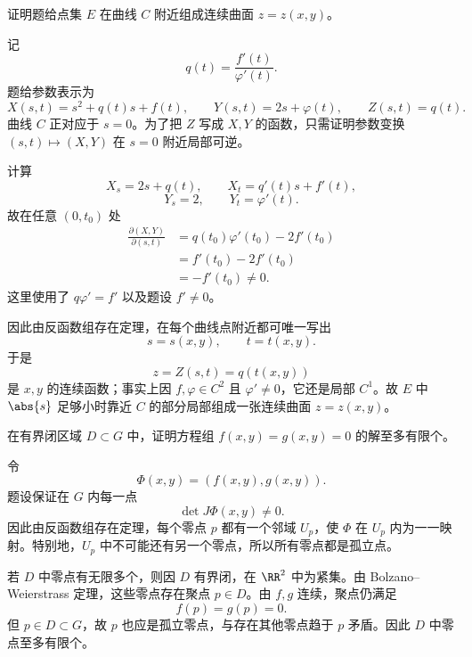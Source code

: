 \begin{xreferenceproblem}[20.5.2 第一组参考题 7]
证明题给点集 $E$ 在曲线 $C$ 附近组成连续曲面 $z=z(x,y)$。
\end{xreferenceproblem}
\begin{xsolution}
记
\[
  q(t)=\frac{f'(t)}{\varphi'(t)}.
\]
题给参数表示为
\[
  X(s,t)=s^2+q(t)s+f(t),
  \qquad
  Y(s,t)=2s+\varphi(t),
  \qquad
  Z(s,t)=q(t).
\]
曲线 $C$ 正对应于 $s=0$。为了把 $Z$ 写成 $X,Y$ 的函数，只需证明参数变换 $(s,t)\mapsto(X,Y)$ 在 $s=0$ 附近局部可逆。

计算
\[
  X_s=2s+q(t),
  \qquad
  X_t=q'(t)s+f'(t),
\]
\[
  Y_s=2,
  \qquad
  Y_t=\varphi'(t).
\]
故在任意 $(0,t_0)$ 处
\begin{align*}
  \frac{\partial(X,Y)}{\partial(s,t)}
  &=q(t_0)\varphi'(t_0)-2f'(t_0)\\
  &=f'(t_0)-2f'(t_0)\\
  &=-f'(t_0)\ne0.
\end{align*}
这里使用了 $q\varphi'=f'$ 以及题设 $f'\ne0$。

因此由反函数组存在定理，在每个曲线点附近都可唯一写出
\[
  s=s(x,y),\qquad t=t(x,y).
\]
于是
\[
  z=Z(s,t)=q(t(x,y))
\]
是 $x,y$ 的连续函数；事实上因 $f,\varphi\in C^2$ 且 $\varphi'\ne0$，它还是局部 $C^1$。故 $E$ 中 $\abs{s}$ 足够小时靠近 $C$ 的部分局部组成一张连续曲面 $z=z(x,y)$。
\end{xsolution}

\begin{xreferenceproblem}[20.5.2 第一组参考题 8]
在有界闭区域 $D\subset G$ 中，证明方程组 $f(x,y)=g(x,y)=0$ 的解至多有限个。
\end{xreferenceproblem}
\begin{xsolution}
令
\[
  \Phi(x,y)=(f(x,y),g(x,y)).
\]
题设保证在 $G$ 内每一点
\[
  \det J\Phi(x,y)\ne0.
\]
因此由反函数组存在定理，每个零点 $p$ 都有一个邻域 $U_p$，使 $\Phi$ 在 $U_p$ 内为一一映射。特别地，$U_p$ 中不可能还有另一个零点，所以所有零点都是孤立点。

若 $D$ 中零点有无限多个，则因 $D$ 有界闭，在 $\RR^2$ 中为紧集。由 Bolzano--Weierstrass 定理，这些零点存在聚点 $p\in D$。由 $f,g$ 连续，聚点仍满足
\[
  f(p)=g(p)=0.
\]
但 $p\in D\subset G$，故 $p$ 也应是孤立零点，与存在其他零点趋于 $p$ 矛盾。因此 $D$ 中零点至多有限个。
\end{xsolution}

